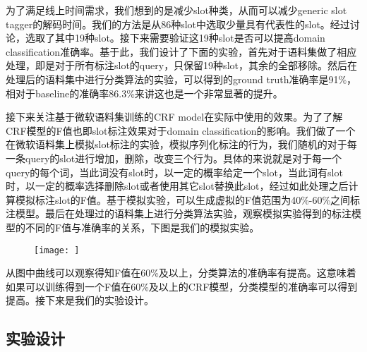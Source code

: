 \documentclass[master]{njuthesis}
\begin{document}
    为了满足线上时间需求，我们想到的是减少slot种类，从而可以减少generic slot tagger的解码时间。我们的方法是从86种slot中选取少量具有代表性的slot。经过讨论，选取了其中19种slot。接下来需要验证这19种slot是否可以提高domain classification准确率。基于此，我们设计了下面的实验，首先对于语料集做了相应处理，即是对于所有标注slot的query，只保留19种slot，其余的全部移除。然后在处理后的语料集中进行分类算法的实验，可以得到的ground truth准确率是91\%，相对于baseline的准确率86.3\%来讲这也是一个非常显著的提升。
    
    接下来关注基于微软语料集训练的CRF model在实际中使用的效果。为了了解CRF模型的F值也即slot标注效果对于domain classification的影响。我们做了一个在微软语料集上模拟slot标注的实验，模拟序列化标注的行为，我们随机的对于每一条query的slot进行增加，删除，改变三个行为。具体的来说就是对于每一个query的每个词，当此词没有slot时，以一定的概率给定一个slot，当此词有slot时，以一定的概率选择删除slot或者使用其它slot替换此slot，经过如此处理之后计算模拟标注slot的F值。基于模拟实验，可以生成虚拟的F值范围为40\%-60\%之间标注模型。最后在处理过的语料集上进行分类算法实验，观察模拟实验得到的标注模型的不同的F值与准确率的关系，下图是我们的模拟实验。
    \begin{figure}[htbp]
      \centering
      \texttt{[image: ]}
      \caption{}\label{fig:test1}
    \end{figure}

    
    从图中曲线可以观察得知F值在60\%及以上，分类算法的准确率有提高。这意味着如果可以训练得到一个F值在60\%及以上的CRF模型，分类模型的准确率可以得到提高。接下来是我们的实验设计。

\subsection{实验设计}
\end{document}
